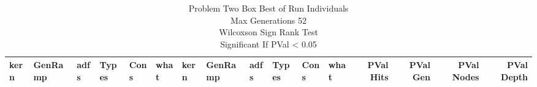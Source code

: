 \begin{sidewaystable}[ht]
\caption{Problem  Two Box Best of Run Individuals \\ Max Generations 52\\Wilcoxson Sign Rank Test\\Significant If PVal < 0.05}
\begin{center}
\scalebox{0.7} %
{
\begin{tabular}{|llllll|llllll|rrrr|}
\hline
kern & GenRamp & adfs & Types & Cons & what & kern & GenRamp & adfs & Types & Cons & what & PVal Hits & PVal Gen & PVal Nodes & PVal Depth \\
\hline


\hline
\end{tabular}
}
\end{center}
\end{sidewaystable}


